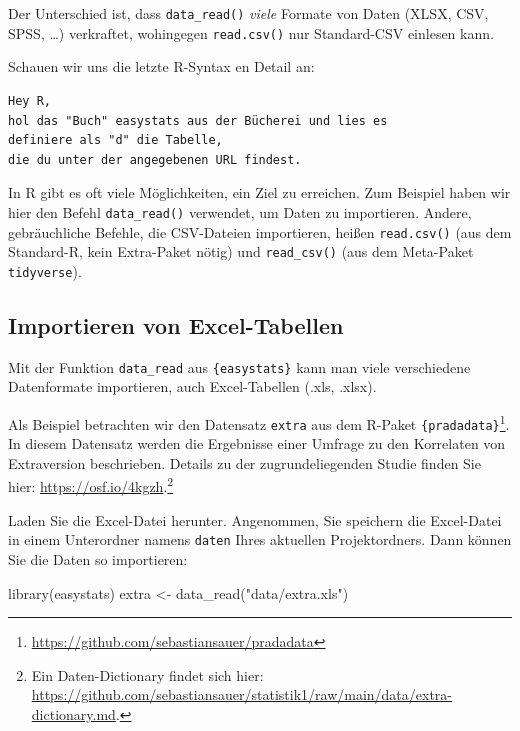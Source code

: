 \documentclass[
  letterpaper,
]{scrbook}
\newenvironment{Shaded}{\begin{snugshade}}{\end{snugshade}}
\newcommand{\FunctionTok}[1]{\textcolor[rgb]{0.28,0.35,0.67}{#1}}
\newcommand{\NormalTok}[1]{\textcolor[rgb]{0.00,0.23,0.31}{#1}}
\newcommand{\OtherTok}[1]{\textcolor[rgb]{0.00,0.23,0.31}{#1}}
\newcommand{\StringTok}[1]{\textcolor[rgb]{0.13,0.47,0.30}{#1}}
\theoremstyle{definition}
\theoremstyle{definition}
\theoremstyle{definition}
\theoremstyle{remark}
\begin{document}
Der Unterschied ist, dass \texttt{data\_read()} \emph{viele} Formate von
Daten (XLSX, CSV, SPSS, \ldots) verkraftet, wohingegen
\texttt{read.csv()} nur Standard-CSV einlesen kann.

Schauen wir uns die letzte R-Syntax en Detail an:

\begin{verbatim}
Hey R,
hol das "Buch" easystats aus der Bücherei und lies es
definiere als "d" die Tabelle,
die du unter der angegebenen URL findest.
\end{verbatim}

In R gibt es oft viele Möglichkeiten, ein Ziel zu erreichen. Zum
Beispiel haben wir hier den Befehl \texttt{data\_read()} verwendet, um
Daten zu importieren. Andere, gebräuchliche Befehle, die CSV-Dateien
importieren, heißen \texttt{read.csv()} (aus dem Standard-R, kein
Extra-Paket nötig) und \texttt{read\_csv()} (aus dem Meta-Paket
\texttt{tidyverse}).

\subsection{Importieren von
Excel-Tabellen}\label{importieren-von-excel-tabellen}

Mit der Funktion \texttt{data\_read} aus \texttt{\{easystats\}} kann man
viele verschiedene Datenformate importieren, auch Excel-Tabellen (.xls,
.xlsx).

Als Beispiel betrachten wir den Datensatz \texttt{extra} aus dem R-Paket
\texttt{\{pradadata\}}\footnote{\url{https://github.com/sebastiansauer/pradadata}}.
In diesem Datensatz werden die Ergebnisse einer Umfrage zu den
Korrelaten von Extraversion beschrieben. Details zu der
zugrundeliegenden Studie finden Sie hier:
\url{https://osf.io/4kgzh}.\footnote{Ein Daten-Dictionary findet sich
  hier:
  \url{https://github.com/sebastiansauer/statistik1/raw/main/data/extra-dictionary.md}.}

Laden Sie die Excel-Datei herunter. Angenommen, Sie speichern die
Excel-Datei in einem Unterordner namens \texttt{daten} Ihres aktuellen
Projektordners. Dann können Sie die Daten so importieren:

\begin{Shaded}
\begin{Highlighting}[]
\FunctionTok{library}\NormalTok{(easystats)}
\NormalTok{extra }\OtherTok{\textless{}{-}} \FunctionTok{data\_read}\NormalTok{(}\StringTok{"data/extra.xls"}\NormalTok{)}
\end{Highlighting}
\end{Shaded}
\end{document}
